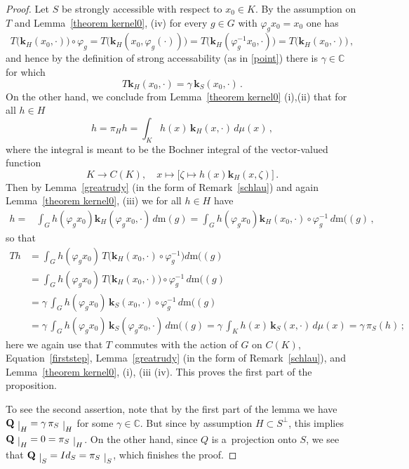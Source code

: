 \documentclass[12pt]{amsart}
\numberwithin{subsection}{section}
\theoremstyle{definition}
\theoremstyle{remark}
\newcommand\restrict[1]{\raisebox{-.5ex}{ $\vert $}_{#1}}
\begin{document}
\begin{proof}
Let $S$ be strongly accessible with respect to   $x_0 \in K$. By the assumption on $T$
and Lemma~\ref{theorem kernel0}, (iv)  for  every $g \in G$ with $\varphi_gx_0=x_0$ one has
\[
T \big(\mathbf{k}_H(x_0, \cdot)\big)
\circ \varphi_g
= T \big(\mathbf{k}_H(x_0, \varphi_g (\cdot)) \big)
= T \big(\mathbf{k}_H({\varphi_g^{-1}x_0}, \cdot)  \big) = T \big(\mathbf{k}_H(x_0, \cdot)\big)\,,
\]
and hence by the definition of strong accessability (as in  \eqref{point}) there is $\gamma \in \mathbb{C}$ for which
\begin{equation}\label{firststep}
T  \mathbf{k}_H(x_0, \cdot) = \gamma\,  \mathbf{k}_S(x_0, \cdot)\,.
\end{equation}
On the other hand, we conclude from Lemma~\ref{theorem kernel0} (i),(ii) that for all $h \in H$
\[
h= \pi_H h = \int_{K} h(x) \,\mathbf{k}_H(x, \cdot)\,d\mu(x)\,,
\]
where the integral is meant to be  the Bochner integral of the vector-valued function 
$$
K \longrightarrow C(K), \quad x \mapsto \big[\zeta \mapsto h(x) \mathbf{k}_H(x, \zeta)\big]\,.
$$
 Then by Lemma~\ref{greatrudy} (in the form of Remark~\ref{schlau}) and again Lemma~\ref{theorem kernel0}, (iii) we for all $h \in H$
 have
\begin{align*}
  h =
  &
   \int_{G} h(\varphi_gx_0)
      \mathbf{k}_H(\varphi_gx_0, \cdot)\, d\mathrm{m}(g)
      =
   \int_{G} h(\varphi_gx_0)  \mathbf{k}_H(x_0, \cdot)
    \circ \varphi_g^{-1}\,d\mathrm{m}( (g)\,,
\end{align*}
so that 
\begin{align*}
  Th
  &
  =
     \int_{G} h(\varphi_gx_0) \, T\big(\mathbf{k}_H(x_0, \cdot) \circ \varphi_g^{-1}\big) d\mathrm{m}( (g)
     \\&
          =
     \int_{G} h(\varphi_gx_0)\, T\big(\mathbf{k}_H(x_0, \cdot)\big) \circ \varphi_g^{-1}\,d\mathrm{m}( (g)
     \\&
         =
     \gamma \,
     \int_{G} h(\varphi_gx_0) \, \mathbf{k}_S(x_0, \cdot)
      \circ \varphi_g^{-1}\,d\mathrm{m}( (g)
      \\&
          =
          \gamma\, \int_{G} h(\varphi_gx_0) \, \mathbf{k}_S(\varphi_gx_0, \cdot)\,d\mathrm{m}( (g)
          =
     \gamma \,
     \int_{K} h(x) \,\mathbf{k}_S(x, \cdot)\, d\mu(x)
      = \gamma \, \pi_S(h)
     \,;
            \end{align*}
        here we again use that $T$ commutes with the action of $G$ on $C(K)$, Equation~\eqref{firststep},
Lemma~\ref{greatrudy} (in the form of Remark~\ref{schlau}), and   Lemma~\ref{theorem kernel0}, (i), (iii (iv).
This proves the first part of the proposition.

To see the second assertion, note  that by  the first part of the lemma  we have $\mathbf{Q}\restrict{H}=\gamma \,\pi_S\restrict {H}$ for some
$\gamma  \in \mathbb{C}$. But since by assumption $H\subset S^\perp$, this implies $\mathbf{Q}\restrict{H}= 0=\pi_{S}\restrict {H}$.
 On the other hand,  since $Q$ is a~projection onto $S$, we see that  $\mathbf{Q}\restrict{S}=Id_{S}=\pi_S\restrict {S}$, which finishes
 the proof.
  \end{proof}
\end{document}
